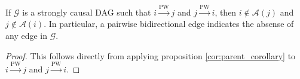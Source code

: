 \documentclass[12pt]{article}
\def\pwgc{\overset{\text{PW}}{\rightarrow}}  %
\def\gcg{\mathcal{G}}  %
\newcommand{\pa}[1]{pa(#1)}  %
\newcommand{\anc}[1]{\mathcal{A}(#1)}  %
\begin{document}
\begin{corollary}
  \label{cor:bidirectional_edge}
  If $\gcg$ is a strongly causal DAG such that $i \pwgc j$ and
  $j \pwgc i$, then $i \not\in \anc{j}$ and $j \not\in \anc{i}$.  In
  particular, a pairwise bidirectional edge indicates the absense of
  any edge in $\gcg$.
\end{corollary}
\begin{proof}
  This follows directly from applying proposition
  \ref{cor:parent_corollary} to $i \pwgc j$ and $j \pwgc i$.
\end{proof}


\end{document}
